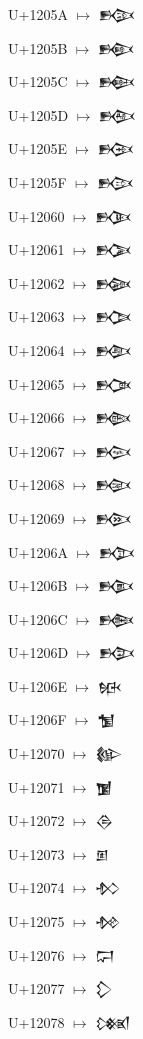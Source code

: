 {\noindent U+1205A  $\mapsto$ {\cufont 𒁚}\par
\noindent U+1205B  $\mapsto$ {\cufont 𒁛}\par
\noindent U+1205C  $\mapsto$ {\cufont 𒁜}\par
\noindent U+1205D  $\mapsto$ {\cufont 𒁝}\par
\noindent U+1205E  $\mapsto$ {\cufont 𒁞}\par
\noindent U+1205F  $\mapsto$ {\cufont 𒁟}\par
\noindent U+12060  $\mapsto$ {\cufont 𒁠}\par
\noindent U+12061  $\mapsto$ {\cufont 𒁡}\par
\noindent U+12062  $\mapsto$ {\cufont 𒁢}\par
\noindent U+12063  $\mapsto$ {\cufont 𒁣}\par
\noindent U+12064  $\mapsto$ {\cufont 𒁤}\par
\noindent U+12065  $\mapsto$ {\cufont 𒁥}\par
\noindent U+12066  $\mapsto$ {\cufont 𒁦}\par
\noindent U+12067  $\mapsto$ {\cufont 𒁧}\par
\noindent U+12068  $\mapsto$ {\cufont 𒁨}\par
\noindent U+12069  $\mapsto$ {\cufont 𒁩}\par
\noindent U+1206A  $\mapsto$ {\cufont 𒁪}\par
\noindent U+1206B  $\mapsto$ {\cufont 𒁫}\par
\noindent U+1206C  $\mapsto$ {\cufont 𒁬}\par
\noindent U+1206D  $\mapsto$ {\cufont 𒁭}\par
\noindent U+1206E  $\mapsto$ {\cufont 𒁮}\par
\noindent U+1206F  $\mapsto$ {\cufont 𒁯}\par
\noindent U+12070  $\mapsto$ {\cufont 𒁰}\par
\noindent U+12071  $\mapsto$ {\cufont 𒁱}\par
\noindent U+12072  $\mapsto$ {\cufont 𒁲}\par
\noindent U+12073  $\mapsto$ {\cufont 𒁳}\par
\noindent U+12074  $\mapsto$ {\cufont 𒁴}\par
\noindent U+12075  $\mapsto$ {\cufont 𒁵}\par
\noindent U+12076  $\mapsto$ {\cufont 𒁶}\par
\noindent U+12077  $\mapsto$ {\cufont 𒁷}\par
\noindent U+12078  $\mapsto$ {\cufont 𒁸}\par
}
